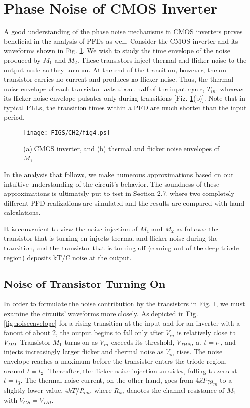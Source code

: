 \section{Phase Noise of CMOS Inverter}
A good understanding of the phase noise mechanisms in CMOS inverters proves beneficial in the analysis of PFDs as well. Consider the CMOS inverter
and its waveforms shown in Fig. \ref{fig:noisepercycle}. We wish to study the time envelope of the noise produced by $M_1$ and $M_2$. These transistors inject
thermal and flicker noise to the output node as they turn on. At the end of the transition, however, the on transistor carries no current and
produces no flicker noise. Thus, the thermal noise envelope of each transistor lasts about half of the input cycle, $T_{in}$, whereas its flicker
noise envelope pulsates only during transitions [Fig. \ref{fig:noisepercycle}(b)]. Note that in typical PLLs, the transition times within a PFD are much shorter than the input
period.

\begin{figure}[htb!]
\centering
\texttt{[image: FIGS/CH2/fig4.ps]}
\caption{(a) CMOS inverter, and (b) thermal and flicker noise envelopes of $M_1$.}
\label{fig:noisepercycle}
\end{figure}

In the analysis that follows, we make numerous approximations based on our intuitive understanding of the circuit's behavior. The soundness of
these approximations is ultimately put to test in Section 2.7, where two completely different PFD realizations are simulated and the results are
compared with hand calculations.

It is convenient to view the noise injection of $M_1$ and $M_2$ as follows: the transistor that is turning on injects thermal and flicker noise
during the transition, and the transistor that is turning off (coming out of the deep triode region) deposits kT/C noise at the output.

\subsection{Noise of Transistor Turning On}
In order to formulate the noise contribution by the transistors in Fig. \ref{fig:noisepercycle}, we must examine the circuits' waveforms more
closely. As depicted in Fig. \ref{fig:noiseenvelope} for a rising transition at the input and for an inverter with a fanout of about 2, the output begins to fall only
after $V_{in}$ is relatively close to $V_{DD}$. Transistor $M_1$ turns on as $V_{in}$ exceeds its threshold, $V_{THN}$, at $t=t_1$, and injects increasingly
larger flicker and thermal noise as $V_{in}$ rises. The noise envelope reaches a maximum before the transistor enters the triode region, around
$t=t_2$. Thereafter, the flicker noise injection subsides, falling to zero at $t=t_3$. The thermal noise current, on the other hand, goes from
$4kT\gamma g_m$ to a slightly lower value, $4kT$/$R_{on}$, where $R_{on}$ denotes the channel resistance of $M_1$ with $V_{GS}=V_{DD}$.

